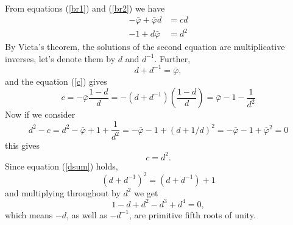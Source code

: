 \documentclass[11pt]{book}
\theoremstyle{Rem}
\theoremstyle{definition}
\numberwithin{equation}{section}
\newcommand\inv{^{-1}}
\begin{document}
From equations (\ref{br1}) and (\ref{br2}) we have 
\begin{align}
	-\bar{\varphi} + \bar{\varphi} d  &= cd\label{c}\\
	-1 + d\bar{\varphi} &= d^2 \label{d}
\end{align} 
By Vieta's theorem, the solutions of the second equation are multiplicative inverses, let's denote them by $d$ and $d\inv$. Further, \begin{equation}
	d + d\inv = \bar{\varphi}, \label{dsum}
\end{equation} and the equation (\ref{c}) gives\begin{equation}
	c = -\bar{\varphi}\frac{1-d}d = -(d+ d\inv)(\frac{1-d}d) = \bar{\varphi} -1 -\frac{1}{d^2}
\end{equation}
Now if we consider  \begin{equation}
	d^2-c = d^2-\bar{\varphi} + 1 + \frac{1}{d^2} = -\bar{\varphi} -1 + (d+1/d)^2 = - \bar{\varphi} -1 + \bar{\varphi}^2 = 0
\end{equation}
this gives \begin{equation}\label{cdsq}
	c = d^2.
\end{equation}
Since equation (\ref{dsum}) holds,
 \begin{equation}
	(d+d\inv)^2 = (d+d\inv) + 1
\end{equation}
and multiplying throughout by $d^2$ we get \begin{equation}
	1 - d + d^2 - d^3 + d^4 = 0,
\end{equation}
which means $-d$, as well as $-d\inv$, are primitive fifth roots of unity.
\end{document}
